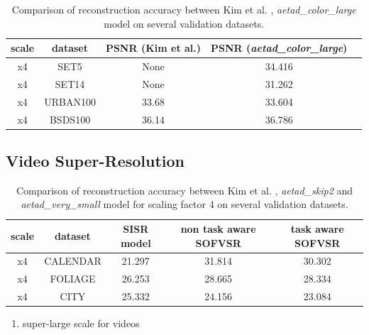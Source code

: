 \begin{table}[!htbp]
	\begin{center}
	\begin{tabular}{c|c|c|c|c}
	scale & dataset & PSNR (Kim et al.) & PSNR (\textit{aetad\_color\_large}) \\
	\hline
  x4 & SET5 & None & 34.416 \\
	x4 & SET14 & None & 31.262 \\
	x4 & URBAN100 & 33.68 & 33.604 \\
	x4 & BSDS100 & 36.14 & 36.786 \\
	\end{tabular}
	\caption{Comparison of reconstruction accuracy between Kim et al. \cite{TAID},
	\textit{aetad\_color\_large} model on several validation datasets. }
	\label{table:icperformance}
	\end{center}
\end{table}

\subsection{Video Super-Resolution}
\label{sec:Experiments_VSR}

\begin{table}[!htbp]
	\begin{center}
	\begin{tabular}{c|c|c|c|c}
	scale & dataset & \ac{SISR} model & non task aware SOFVSR
	& task aware SOFVSR \\
	\hline
  x4 & CALENDAR & 21.297 & 31.814 & 30.302 \\
	x4 & FOLIAGE & 26.253 & 28.665 & 28.334 \\
	x4 & CITY & 25.332 & 24.156 & 23.084 \\
	\end{tabular}
	\caption{Comparison of reconstruction accuracy between Kim et al. \cite{TAID},
	\textit{aetad\_skip2} and \textit{aetad\_very\_small}
	model for scaling factor 4 on several validation datasets. }
	\label{table:vsrperformance}
	\end{center}
\end{table}


\begin{enumerate}
\item super-large scale for videos
\end{enumerate}

